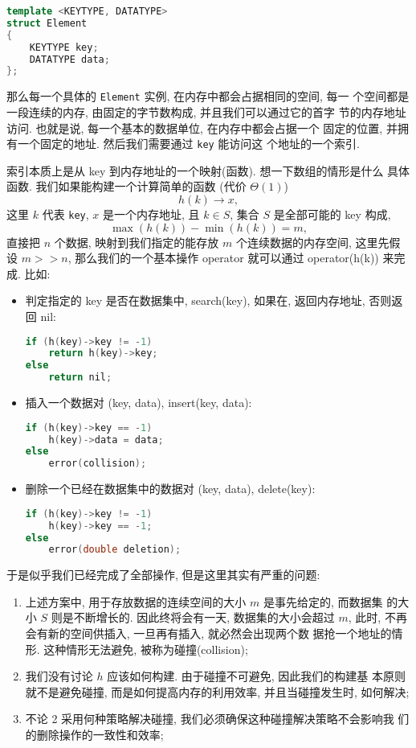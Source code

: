 \documentclass[a4paper]{ctexart}
\theoremstyle{definition}
\theoremstyle{definition}
\begin{document}
\begin{lstlisting}[language=C++]
template <KEYTYPE, DATATYPE>
struct Element
{
    KEYTYPE key;
    DATATYPE data;
};
\end{lstlisting}

那么每一个具体的 \verb|Element| 实例, 在内存中都会占据相同的空间, 每一
个空间都是一段连续的内存, 由固定的字节数构成, 并且我们可以通过它的首字
节的内存地址访问. 也就是说, 每一个基本的数据单位, 在内存中都会占据一个
固定的位置, 并拥有一个固定的地址. 然后我们需要通过 \verb|key| 能访问这
个地址的一个索引.

索引本质上是从 key 到内存地址的一个映射(函数). 想一下数组的情形是什么
具体函数. 我们如果能构建一个计算简单的函数 (代价 $\Theta(1)$)
$$
h(k) \to x,
$$
这里 $k$ 代表 \verb|key|, $x$ 是一个内存地址, 且 $k \in S$, 集合 $S$
是全部可能的 key 构成,
$$
\max(h(k)) - \min(h(k)) = m,
$$
直接把 $n$ 个数据, 映射到我们指定的能存放 $m$ 个连续数据的内存空间, 这里先假设 $m
>> n$, 那么我们的一个基本操作 operator 就可以通过 operator(h(k)) 来完
成. 比如:
\begin{itemize}

  \item 判定指定的 key 是否在数据集中, search(key), 如果在, 返回内存地址,
     否则返回 nil:

\begin{lstlisting}[language=C++]
if (h(key)->key != -1)
    return h(key)->key;
else
    return nil;
\end{lstlisting}

\item 插入一个数据对 (key, data), insert(key, data):
\begin{lstlisting}[language=C++]
if (h(key)->key == -1)
    h(key)->data = data;
else
    error(collision);
\end{lstlisting}

\item 删除一个已经在数据集中的数据对 (key, data), delete(key):
\begin{lstlisting}[language=C++]
if (h(key)->key != -1)
    h(key)->key == -1;
else
    error(double deletion);
\end{lstlisting}
\end{itemize}

于是似乎我们已经完成了全部操作, 但是这里其实有严重的问题:

\begin{enumerate}
\item 上述方案中, 用于存放数据的连续空间的大小 $m$ 是事先给定的, 而数据集
   的大小 $S$ 则是不断增长的. 因此终将会有一天, 数据集的大小会超过
   $m$, 此时, 不再会有新的空间供插入, 一旦再有插入, 就必然会出现两个数
   据抢一个地址的情形. 这种情形无法避免, 被称为碰撞(collision);
\item 我们没有讨论 $h$ 应该如何构建. 由于碰撞不可避免, 因此我们的构建基
    本原则就不是避免碰撞, 而是如何提高内存的利用效率, 并且当碰撞发生时,
    如何解决;
\item 不论 2 采用何种策略解决碰撞, 我们必须确保这种碰撞解决策略不会影响我
   们的删除操作的一致性和效率;
\end{enumerate}
\end{document}

